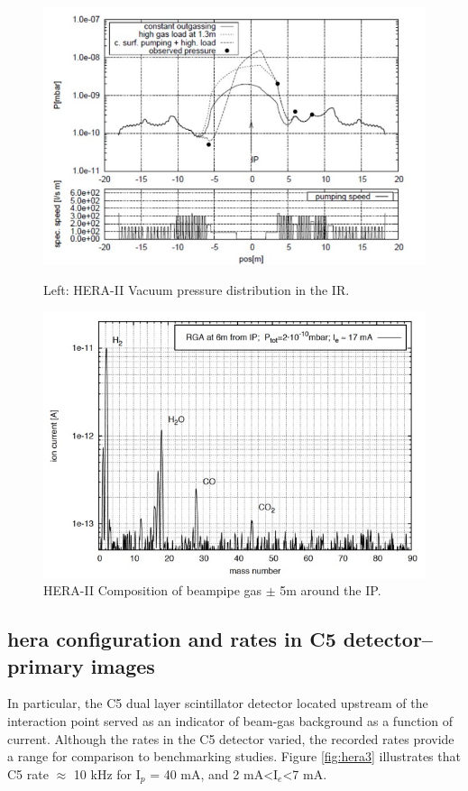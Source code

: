 \begin{figure}
	\centering
	\begin{minipage}{0.45\textwidth}
		\centering
		\includegraphics[width=.75\textwidth]{../../img/hera_badvac_regions.jpg}
		\caption {Left: HERA-II Vacuum pressure distribution in the IR.  }
		
	\end{minipage}\hfill
	\begin{minipage}{0.45\textwidth}
		\centering	\includegraphics[width=.75\textwidth]{../../img/hera_badvac_comp.jpg}	
		\caption {HERA-II Composition of beampipe gas $\pm$ 5m around the IP. }
	\end{minipage}
	
\end{figure}


\subsection{hera configuration and rates in C5 detector-- primary images}
In particular, the C5 dual layer scintillator detector located upstream of the interaction point served as an indicator of beam-gas background as a function of current.   Although the rates in the C5 detector varied, the recorded rates provide a range for comparison to benchmarking studies.  Figure \ref{fig:hera3} illustrates that C5 rate $\approx$ 10 kHz for I$_{p}$ = 40 mA, and 2 mA\textless I$_{e}$\textless 7 mA.  

